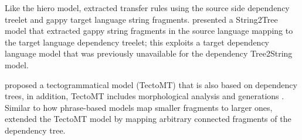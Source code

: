 Like the hiero model, \cite{xiong2007dependency} extracted transfer rules using the source side dependency treelet and gappy target language string fragments. \cite{shen2008new} presented a String2Tree model that extracted gappy string fragments in the source language mapping to the target language dependency treelet; this exploits a target dependency language model that was previously unavailable for the dependency Tree2String model. 

\cite{tectomt2003} proposed a tectogrammatical model (TectoMT) that is also based on dependency trees, in addition, TectoMT includes morphological analysis and generations \citep{eisner2003learning,vzabokrtsky2008tectomt,popel2010tectomt}. Similar to how phrase-based models map smaller fragments to larger ones, \cite{bojar2008phrase} extended the TectoMT model by mapping arbitrary connected fragments of the dependency tree. 